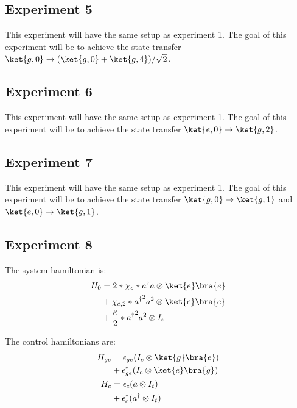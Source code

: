 \documentclass[letterpaper, 12pt]{article}
\begin{document}
\subsection{Experiment 5}
This experiment will have the same setup as experiment 1. The goal of this experiment will be to achieve the state transfer $\ket{g, 0} \rightarrow (\ket{g, 0} + \ket{g, 4}) / \sqrt{2}$.

\subsection{Experiment 6}
This experiment will have the same setup as experiment 1. The goal of this experiment will be to achieve the state transfer $\ket{e, 0} \rightarrow \ket{g, 2}$.

\subsection{Experiment 7}
This experiment will have the same setup as experiment 1. The goal of this experiment will be to achieve the state transfer $\ket{g, 0} \rightarrow \ket{g, 1}$ and $\ket{e, 0} \rightarrow \ket{g, 1}$.

\subsection{Experiment 8}
The system hamiltonian is:
\begin{align*}
  H_{0}
  &= 2 * \chi_{e} * a^{\dagger}a \otimes \ket{e}\bra{e}\\
  &+ \chi_{e, 2} * {a^{\dagger}}^{2}a^{2} \otimes \ket{e}\bra{e}\\
  &+ \frac{\kappa}{2} * {a^{\dagger}}^{2}a^{2} \otimes I_{t}\\
\end{align*}

The control hamiltonians are:
\begin{align*}
  H_{ge} &= \epsilon_{ge} (I_{c} \otimes \ket{g}\bra{e})\\
         &+ \epsilon_{ge}^{*} (I_{c} \otimes \ket{e}\bra{g})\\
  H_{c} &= \epsilon_{c} (a \otimes I_{t})\\
        &+ \epsilon_{c}^{*} (a^{\dagger} \otimes I_{t})\\
\end{align*}
\end{document}
